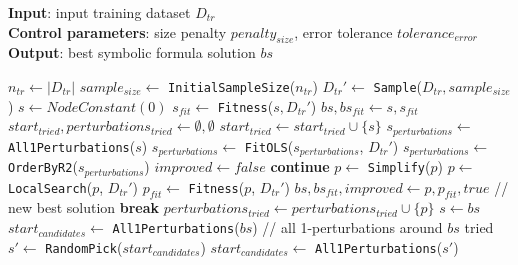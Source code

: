 \documentclass[a4paper,12pt]{elsarticle}
\begin{document}
    \begin{algorithm}
    \footnotesize
    \hspace*{\algorithmicindent} \textbf{Input}: input training dataset $D_{tr}$ \\
     \hspace*{\algorithmicindent} \textbf{Control parameters}: size penalty $penalty_{size}$, error tolerance $tolerance_{error}$ \\
    \hspace*{\algorithmicindent} \textbf{Output}: best symbolic formula solution $bs$
   	\begin{algorithmic}[1] 
   		\State $n_{tr} \gets |D_{tr}|$
   		\State $sample_{size} \gets $ \texttt{InitialSampleSize}($n_{tr}$)
   		\State $D_{tr}' \gets$ \texttt{Sample}($D_{tr}, sample_{size}$)
   		\State $s \gets NodeConstant(0)$ 
   		\State $s_{fit} \gets$ \texttt{Fitness}($s, D_{tr}'$)
   		\State $bs, bs_{fit} \gets s, s_{fit}$ \label{line:solSet}
   		\State $start_{tried}, perturbations_{tried} \gets \emptyset, \emptyset$
   			\State $start_{tried} \gets start_{tried} \cup \{s\}$
   			\State $s_{perturbations} \gets $ \texttt{All1Perturbations}($s$) \label{line:sPert}
   			\State $s_{perturbations} \gets $ \texttt{FitOLS}($s_{perturbations}$, $D_{tr}'$)
   			\State $s_{perturbations} \gets $ \texttt{OrderByR2}($s_{perturbations}$) \label{line:orderR2}
   			\State $improved \gets false $
   					\State \textbf{continue}
   				\EndIf
  				\State $p \gets $ \texttt{Simplify}($p$) \label{line:simp}
  				\State $p \gets $ \texttt{LocalSearch}($p$, $D_{tr}'$) \label{line:ls}
  				\State $p_{fit} \gets$ \texttt{Fitness}($p$, $D_{tr}'$)
  				 \label{line:avoid1}
  					\State $bs, bs_{fit}, improved \gets p, p_{fit}, true$ // new best solution
  					\State \textbf{break}
  				\EndIf \label{line:avoid2}
  				\State $perturbations_{tried} \gets perturbations_{tried} \cup \{p\}$
   			\EndFor
   				\State $s \gets bs$ \label{line:improved}
   			\Else
   				\State $start_{candidates} \gets $ \texttt{All1Perturbations}($bs$)
   				 // all 1-perturbations around $bs$ tried
   					\State $s' \gets $ \texttt{RandomPick}($start_{candidates}$)  \label{line:pert21}
   					\State $start_{candidates} \gets $ \texttt{All1Perturbations}($s'$) \label{line:pert22}

\end{algorithmic}
\end{algorithm}
\end{document}
